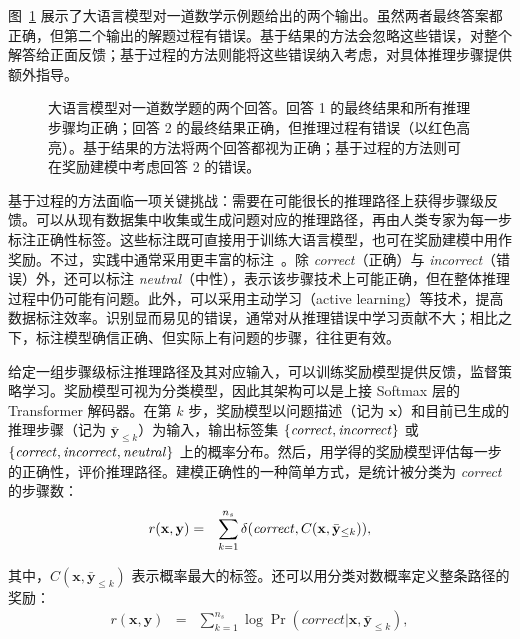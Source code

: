 图~\ref{fig:outcome-vs-process-based-approaches} 展示了大语言模型对一道数学示例题给出的两个输出。虽然两者最终答案都正确，但第二个输出的解题过程有错误。基于结果的方法会忽略这些错误，对整个解答给正面反馈；基于过程的方法则能将这些错误纳入考虑，对具体推理步骤提供额外指导。

\begin{figure}[!t]
\centering

\caption{大语言模型对一道数学题的两个回答。回答 1 的最终结果和所有推理步骤均正确；回答 2 的最终结果正确，但推理过程有错误（以红色高亮）。基于结果的方法将两个回答都视为正确；基于过程的方法则可在奖励建模中考虑回答 2 的错误。}
\label{fig:outcome-vs-process-based-approaches}
\end{figure}

基于过程的方法面临一项关键挑战：需要在可能很长的推理路径上获得步骤级反馈。可以从现有数据集中收集或生成问题对应的推理路径，再由人类专家为每一步标注正确性标签。这些标注既可直接用于训练大语言模型，也可在奖励建模中用作奖励。不过，实践中通常采用更丰富的标注~\cite{lightman-etal:2024lets}。除 \textit{correct}（正确）与 \textit{incorrect}（错误）外，还可以标注 \textit{neutral}（中性），表示该步骤技术上可能正确，但在整体推理过程中仍可能有问题。此外，可以采用主动学习（active learning）等技术，提高数据标注效率。识别显而易见的错误，通常对从推理错误中学习贡献不大；相比之下，标注模型确信正确、但实际上有问题的步骤，往往更有效。

给定一组步骤级标注推理路径及其对应输入，可以训练奖励模型提供反馈，监督策略学习。奖励模型可视为分类模型，因此其架构可以是上接 Softmax 层的 Transformer 解码器。在第 $k$ 步，奖励模型以问题描述（记为 $\mathbf{x}$）和目前已生成的推理步骤（记为 $\bar{\mathbf{y}}_{\le k}$）为输入，输出标签集 $\{\text{\textit{correct}}, \text{\textit{incorrect}}\}$ 或 $\{\text{\textit{correct}}, \text{\textit{incorrect}}, \text{\textit{neutral}}\}$ 上的概率分布。然后，用学得的奖励模型评估每一步的正确性，评价推理路径。建模正确性的一种简单方式，是统计被分类为 \textit{correct} 的步骤数：
\begin{eqnarray}
r(\mathbf{x},\mathbf{y}) & = & \sum_{k=1}^{n_s} \delta(\text{\textit{correct}},C(\mathbf{x},\bar{\mathbf{y}}_{\le k})),
\end{eqnarray}

\noindent 其中，$C(\mathbf{x},\bar{\mathbf{y}}_{\le k})$ 表示概率最大的标签。还可以用分类对数概率定义整条路径的奖励：
\begin{eqnarray}
r(\mathbf{x},\mathbf{y}) & = &  \sum_{k=1}^{n_s} \log \Pr(\textit{correct}|\mathbf{x},\bar{\mathbf{y}}_{\le k}),
\end{eqnarray}


